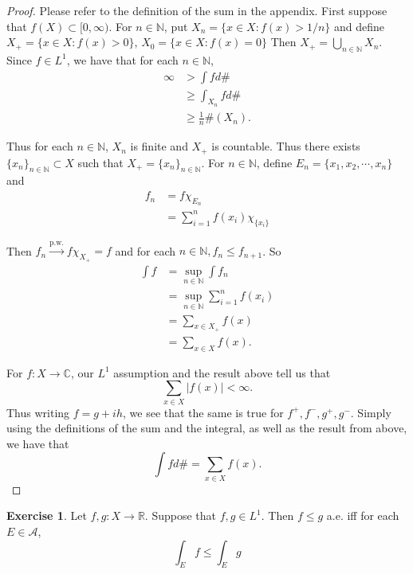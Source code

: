 \documentclass[12pt]{amsart}
\theoremstyle{definition}
\newtheorem{ex}[definition]{Exercise}
\newcommand{\C}{\mathbb{C}}
\newcommand{\N}{\mathbb{N}}
\newcommand{\R}{\mathbb{R}}
\newcommand{\MA}{\mathcal{A}}
\newcommand{\Rg}{[0,\infty)}
\newcommand{\lex}[1]{\label{ex:#1}}
\begin{document}
	\begin{proof} Please refer to the definition of the sum in the appendix. First suppose that $f(X) \subset \Rg$. For $n \in \N$, put $X_n = \{x \in X: f(x) > 1/n\}$ and define $X_+ = \{x \in X: f(x) > 0\}$, $X_0 = \{x \in X: f(x) = 0\}$ Then $X_+ = \bigcup\limits_{n \in \N}X_n$. Since $f \in L^1$, we have that for each $n \in \N$,
		\begin{align*}
			\infty 
			&> \int f d\#\\
			&\geq \int_{X_n} f d\# \\
			&\geq \frac{1}{n} \#(X_n).
		\end{align*}
		
		Thus for each $n \in \N$, $X_n$ is finite and $X_+$ is countable. Thus there exists $\{x_n\}_{n \in \N} \subset X$ such that $X_+ = \{x_n\}_{n \in \N}$. For $n \in \N$, define $E_n = \{x_1, x_2, \cdots, x_n\}$ and 
		\begin{align*}
			f_n 
			&= f \chi_{E_n}\\
			&= \sum_{i = 1}^n f(x_i)\chi_{\{x_i\}}
		\end{align*}
		
		Then $f_n \xrightarrow{\text{p.w.}} f\chi_{X_+} = f$ and for each $n \in \N, f_n \leq f_{n+1}$. So
		\begin{align*}
			\int f 
			&= \sup_{n \in \N} \int f_n\\
			&= \sup_{n \in \N} \sum_{i =1}^n f(x_i)\\
			&= \sum_{x \in X_+} f(x)\\
			&=\sum_{x \in X} f(x).
		\end{align*} 
		
		For $f:X \rightarrow \C$, our $L^1$ assumption and the result above tell us that $$\sum_{x \in X}|f(x)| < \infty.$$ Thus writing $f = g+ih$, we see that the same is true for $f^+,f^-,g^+,g^-$. Simply using the definitions of the sum and the integral, as well as the result from above, we have that $$\int fd\# = \sum_{x \in X}f(x).$$
	\end{proof}
	
	\begin{ex} \lex{00000} 
		Let $f,g:X \rightarrow \R$. Suppose that $f,g \in L^1$. Then $f \leq g$ a.e. iff for each $E \in \MA$, $$\int_E f \leq \int_E g$$  
	\end{ex}
	
\end{document}
